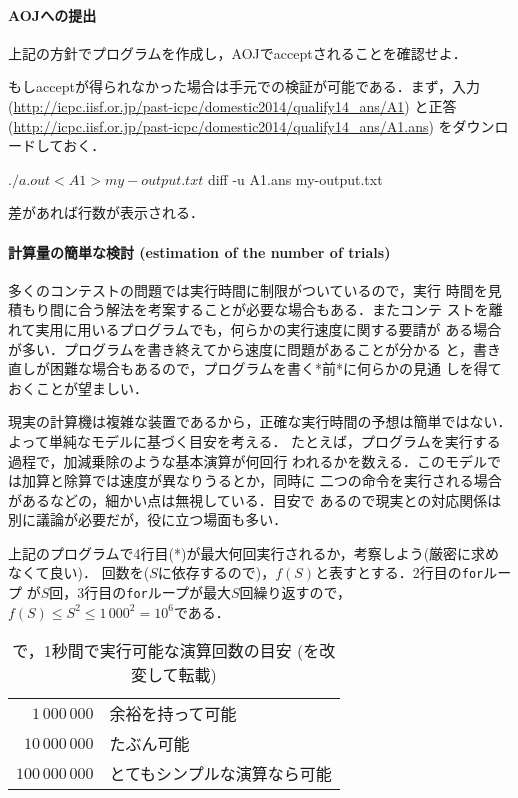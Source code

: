 \paragraph{AOJへの提出}

上記の方針でプログラムを作成し，AOJでacceptされることを確認せよ．

もしacceptが得られなかった場合は手元での検証が可能である．まず，入力
(\url{http://icpc.iisf.or.jp/past-icpc/domestic2014/qualify14_ans/A1})
と正答
(\url{http://icpc.iisf.or.jp/past-icpc/domestic2014/qualify14_ans/A1.ans})
をダウンロードしておく．
\begin{terminal}
  $ ./a.out < A1 > my-output.txt
  $ diff -u A1.ans my-output.txt 
\end{terminal}
差があれば行数が表示される．

\paragraph{計算量の簡単な検討 (estimation of the number of trials)}
多くのコンテストの問題では実行時間に制限がついているので，実行
時間を見積もり間に合う解法を考案することが必要な場合もある．またコンテ
ストを離れて実用に用いるプログラムでも，何らかの実行速度に関する要請が
ある場合が多い．プログラムを書き終えてから速度に問題があることが分かる
と，書き直しが困難な場合もあるので，プログラムを書く*前*に何らかの見通
しを得ておくことが望ましい．

現実の計算機は複雑な装置であるから，正確な実行時間の予想は簡単ではない．よって単純なモデルに基づく目安を考える．
たとえば，プログラムを実行する過程で，加減乗除のような基本演算が何回行
われるかを数える．このモデルでは加算と除算では速度が異なりうるとか，同時に
二つの命令を実行される場合があるなどの，細かい点は無視している．目安で
あるので現実との対応関係は別に議論が必要だが，役に立つ場面も多い．


上記のプログラムで4行目(*)が最大何回実行されるか，考察しよう(厳密に求めなくて良い)．
回数を($S$に依存するので)，$f(S)$と表すとする．2行目の\texttt{for}ループ
が$S$回，3行目の\texttt{for}ループが最大$S$回繰り返すので，$f(S) \le
S^2 \le 1\,000^2=10^6$である．

\begin{table}[h]
  \centering
  \caption{で，1秒間で実行可能な演算回数の目安 (\cite{book:pcc}を改変して転載)}
  \label{table:empirical-estimation}
  \begin{tabular}{rl}\hline
    $1\,000\,000$  &余裕を持って可能\\
    $10\,000\,000$ &たぶん可能\\
    $100\,000\,000$&とてもシンプルな演算なら可能\\\hline
  \end{tabular}
\end{table}

